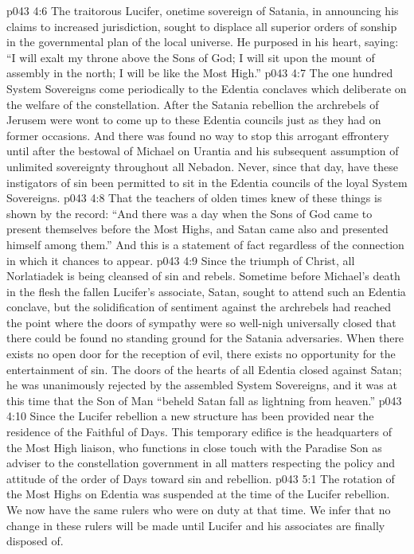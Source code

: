 \vs p043 4:6 The traitorous Lucifer, onetime sovereign of Satania, in announcing his claims to increased jurisdiction, sought to displace all superior orders of sonship in the governmental plan of the local universe. He purposed in his heart, saying: “I will exalt my throne above the Sons of God; I will sit upon the mount of assembly in the north; I will be like the Most High.”
\pc \vs p043 4:7 The one hundred System Sovereigns come periodically to the Edentia conclaves which deliberate on the welfare of the constellation. After the Satania rebellion the archrebels of Jerusem were wont to come up to these Edentia councils just as they had on former occasions. And there was found no way to stop this arrogant effrontery until after the bestowal of Michael on Urantia and his subsequent assumption of unlimited sovereignty throughout all Nebadon. Never, since that day, have these instigators of sin been permitted to sit in the Edentia councils of the loyal System Sovereigns.
\vs p043 4:8 That the teachers of olden times knew of these things is shown by the record: “And there was a day when the Sons of God came to present themselves before the Most Highs, and Satan came also and presented himself among them.” And this is a statement of fact regardless of the connection in which it chances to appear.\plusone
\pc \vs p043 4:9 Since the triumph of Christ, all Norlatiadek is being cleansed of sin and rebels. Sometime before Michael’s death in the flesh the fallen Lucifer’s associate, Satan, sought to attend such an Edentia conclave, but the solidification of sentiment against the archrebels had reached the point where the doors of sympathy were so well\hyp{}nigh universally closed that there could be found no standing ground for the Satania adversaries. When there exists no open door for the reception of evil, there exists no opportunity for the entertainment of sin. The doors of the hearts of all Edentia closed against Satan; he was unanimously rejected by the assembled System Sovereigns, and it was at this time that the Son of Man “beheld Satan fall as lightning from heaven.”
\vs p043 4:10 Since the Lucifer rebellion a new structure has been provided near the residence of the Faithful of Days. This temporary edifice is the headquarters of the Most High liaison, who functions in close touch with the Paradise Son as adviser to the constellation government in all matters respecting the policy and attitude of the order of Days toward sin and rebellion.
\vs p043 5:1 The rotation of the Most Highs on Edentia was suspended at the time of the Lucifer rebellion. We now have the same rulers who were on duty at that time. We infer that no change in these rulers will be made until Lucifer and his associates are finally disposed of.
